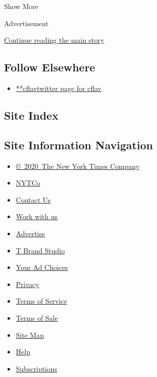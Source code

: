 Show More

Advertisement

\protect\hyperlink{after-mid2}{Continue reading the main story}

\hypertarget{follow-elsewhere}{%
\subsection{Follow Elsewhere}\label{follow-elsewhere}}

\begin{itemize}
\tightlist
\item
  \href{https://twitter.com/cflav}{**cflavtwitter page for cflav}
\end{itemize}

\hypertarget{site-index}{%
\subsection{Site Index}\label{site-index}}

\hypertarget{site-information-navigation}{%
\subsection{Site Information
Navigation}\label{site-information-navigation}}

\begin{itemize}
\tightlist
\item
  \href{https://help.nytimes.com/hc/en-us/articles/115014792127-Copyright-notice}{©~2020~The
  New York Times Company}
\end{itemize}

\begin{itemize}
\tightlist
\item
  \href{https://www.nytco.com/}{NYTCo}
\item
  \href{https://help.nytimes.com/hc/en-us/articles/115015385887-Contact-Us}{Contact
  Us}
\item
  \href{https://www.nytco.com/careers/}{Work with us}
\item
  \href{https://nytmediakit.com/}{Advertise}
\item
  \href{http://www.tbrandstudio.com/}{T Brand Studio}
\item
  \href{https://www.nytimes.com/privacy/cookie-policy\#how-do-i-manage-trackers}{Your
  Ad Choices}
\item
  \href{https://www.nytimes.com/privacy}{Privacy}
\item
  \href{https://help.nytimes.com/hc/en-us/articles/115014893428-Terms-of-service}{Terms
  of Service}
\item
  \href{https://help.nytimes.com/hc/en-us/articles/115014893968-Terms-of-sale}{Terms
  of Sale}
\item
  \href{https://spiderbites.nytimes.com}{Site Map}
\item
  \href{https://help.nytimes.com/hc/en-us}{Help}
\item
  \href{https://www.nytimes.com/subscription?campaignId=37WXW}{Subscriptions}
\end{itemize}
